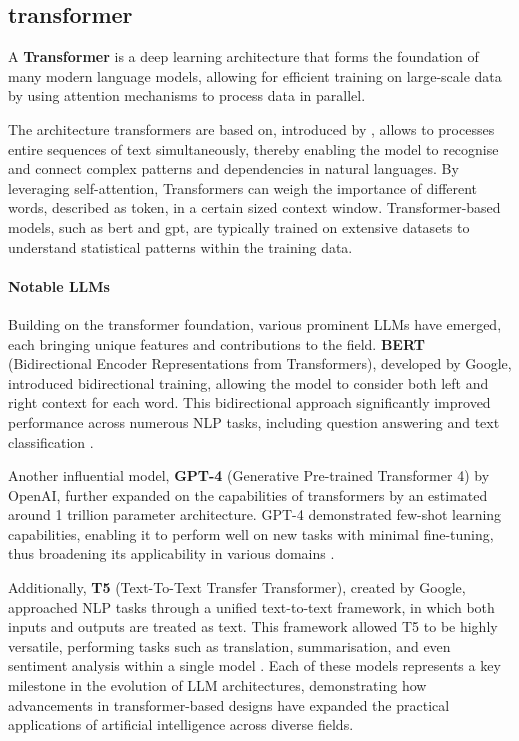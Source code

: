 \subsection{transformer}\label{transformer}
\begin{definition}\label{def:transformer}
    A \textbf{Transformer} is a deep learning architecture that forms the foundation of many modern language models, allowing for efficient training on large-scale data by using attention mechanisms to process data in parallel.
\end{definition}
The architecture transformers are based on, introduced by \citet{vaswani2017attention}, allows to processes entire sequences of text simultaneously, thereby enabling the model to recognise and connect complex patterns and dependencies in natural languages. 
By leveraging self-attention, Transformers can weigh the importance of different words, described as token, in a certain sized context window. 
Transformer-based models, such as \ac{bert} and \ac{gpt}, are typically trained on extensive datasets to understand statistical patterns within the training data.\citep{atallah2023impact}

\paragraph{Notable LLMs} Building on the transformer foundation, various prominent LLMs have emerged, each bringing unique features and contributions to the field. \textbf{BERT} (Bidirectional Encoder Representations from Transformers), developed by Google, introduced bidirectional training, allowing the model to consider both left and right context for each word. This bidirectional approach significantly improved performance across numerous NLP tasks, including question answering and text classification \citep{devlin2019bert}. 

Another influential model, \textbf{GPT-4} (Generative Pre-trained Transformer 4) by OpenAI, further expanded on the capabilities of transformers by an estimated around 1 trillion parameter architecture. GPT-4 demonstrated few-shot learning capabilities, enabling it to perform well on new tasks with minimal fine-tuning, thus broadening its applicability in various domains \citep{brown2020gpt3}. 

Additionally, \textbf{T5} (Text-To-Text Transfer Transformer), created by Google, approached NLP tasks through a unified text-to-text framework, in which both inputs and outputs are treated as text. This framework allowed T5 to be highly versatile, performing tasks such as translation, summarisation, and even sentiment analysis within a single model \citep{raffel2020t5}. Each of these models represents a key milestone in the evolution of LLM architectures, demonstrating how advancements in transformer-based designs have expanded the practical applications of artificial intelligence across diverse fields.

